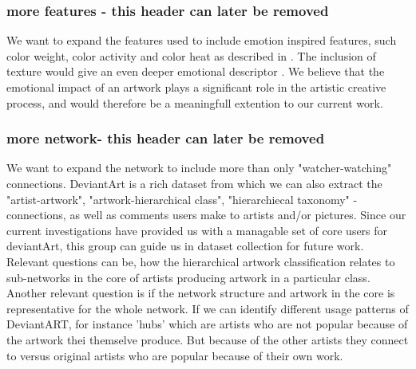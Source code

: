
\subsubsection{more features - this header can later be removed}
We want to expand the features used to include emotion inspired features, such color weight, color activity and color heat as described in \cite{color_emotion1}. The inclusion of texture would give an even deeper emotional descriptor \cite{LucassenECCGIV2010}. We believe that the emotional impact of an artwork plays a significant role in the artistic creative process, and would therefore be a meaningfull extention to our current work. 
\subsubsection{more network- this header can later be removed}
We want to expand the network to include more than only "watcher-watching" connections. DeviantArt is a rich dataset from which we can also extract the "artist-artwork", "artwork-hierarchical class", "hierarchiecal taxonomy" -connections, as well as comments users make to artists and/or pictures. 
Since our current investigations have provided us with a managable set of core users for deviantArt, this group can guide us in dataset collection for future work. Relevant questions can be, how the hierarchical artwork classification relates to sub-networks in the core of artists producing artwork in a particular class. Another relevant question is if the network structure and artwork in the core is representative for the whole network. If we can identify different usage patterns of DeviantART, for instance 'hubs' which are artists who are not popular because of the artwork thei themselve produce. But because of the other artists they connect to versus original artists who are popular because of their own work.

 
